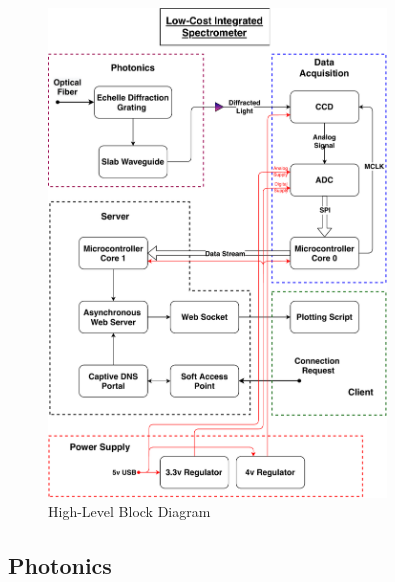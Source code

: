 \documentclass{article}
\begin{document}
    \begin{figure}[H]
    \centering
    \includegraphics[width=0.8\textwidth]{images/Spectrometer Block Diagram.pdf}
    \caption{\label{fig:block_diagram}High-Level Block Diagram}
    \end{figure}
    
    \subsection{Photonics}
\end{document}
